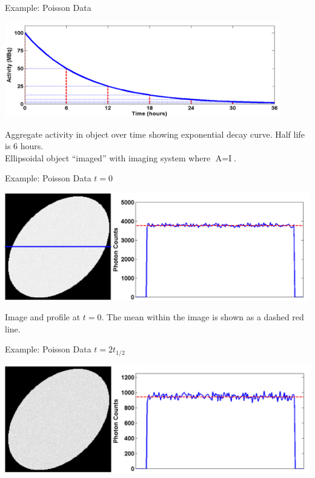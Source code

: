\begin{frame}{Example: Poisson Data }
    \begin{centering}
        \includegraphics[width=0.9\textwidth]{images/decay}\\
    \end{centering}
    Aggregate activity in object over time showing exponential decay curve. Half life is $6$ hours. \\[0.25cm]
    Ellipsoidal object ``imaged'' with imaging system where $\text{A}=\text{I}$.
\end{frame}

\begin{frame}{Example: Poisson Data $t = 0$}
    \begin{centering}
        \includegraphics[width=1\textwidth]{images/poisA}\\
    \end{centering}
    Image and profile at $t=0$. The mean within the image is shown as a dashed red line.
\end{frame}

\begin{frame}{Example: Poisson Data $t = 2t_{1/2}$}
    \begin{centering}
        \includegraphics[width=1\textwidth]{images/poisB}\\
    \end{centering}

\end{frame}

